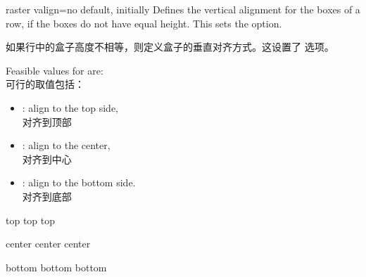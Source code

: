 \begin{docTcbKey}[][doc new=2014-11-10]{raster valign}{=}{no default, initially }
Defines the vertical alignment for the boxes of a row,
if the boxes do not have equal height. This sets the
 option.

如果行中的盒子高度不相等，则定义盒子的垂直对齐方式。这设置了  选项。

Feasible values for  are:\\可行的取值包括：
\begin{itemize}
\item{}: align to the top side,\\对齐到顶部
\item{}: align to the center,\\对齐到中心
\item{}: align to the bottom side.\\对齐到底部
\end{itemize}

\begin{dispExample}
\begin{tcbitemize}[raster valign=top, raster columns=3,
size=small,colframe=red!50!black,colback=red!10!white]
\tcbitem \Huge top
\tcbitem \Large top
\tcbitem top
\end{tcbitemize}
\begin{tcbitemize}[raster valign=center, raster columns=3,
size=small,colframe=blue!50!black,colback=blue!10!white]
\tcbitem \Huge center
\tcbitem \Large center
\tcbitem center
\end{tcbitemize}
\begin{tcbitemize}[raster valign=bottom, raster columns=3,
size=small,colframe=green!50!black,colback=green!10!white]
\tcbitem \Huge bottom
\tcbitem \Large bottom
\tcbitem bottom
\end{tcbitemize}
\end{dispExample}
\end{docTcbKey}


